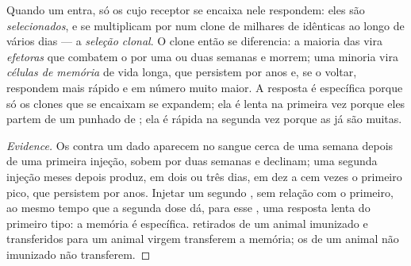 \begin{proposition}\label{prop:g12:adaptive-immunity:selection}
Quando um  entra, só os  cujo receptor se encaixa
nele respondem: eles são \emph{selecionados}, e se multiplicam por
 num clone de milhares de  idênticas ao longo de vários
dias --- a \emph{seleção clonal}. O clone então
se diferencia: a maioria das  vira \emph{ efetoras} que
combatem o  por uma ou duas semanas e morrem; uma minoria vira
\emph{células de memória} de vida longa, que
persistem por anos e, se o  voltar, respondem mais rápido e em
número muito maior. A resposta é específica porque só os clones que se
encaixam se expandem; ela é lenta na primeira vez porque eles partem de
um punhado de ; ela é rápida na segunda vez porque as  já são muitas.
\end{proposition}
\begin{proof}[Evidence]
Os  contra um dado  aparecem no sangue cerca de uma
semana depois de uma primeira injeção, sobem por duas semanas e
declinam; uma segunda injeção meses depois produz, em dois ou três
dias,  em dez a cem vezes o primeiro pico, que persistem por
anos. Injetar um segundo , sem relação com o primeiro, ao mesmo
tempo que a segunda dose dá, para esse , uma resposta lenta do
primeiro tipo: a memória é específica.  retirados de um
animal imunizado e transferidos para um animal virgem transferem a
memória; os de um animal não imunizado não transferem.
\end{proof}

